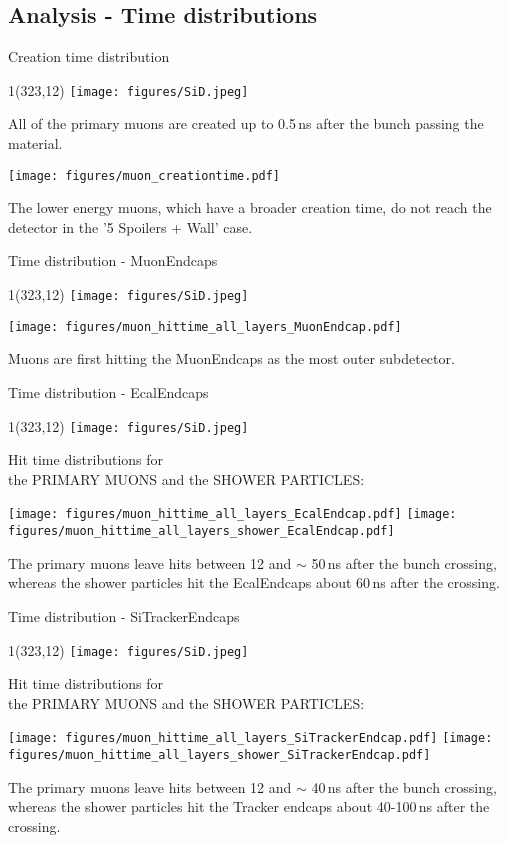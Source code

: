 \documentclass[xcolor={dvipsnames}]{beamer}
\newcommand{\sidlogo}{
  \setlength{\TPHorizModule}{1pt}
  \setlength{\TPVertModule}{1pt}
  \begin{textblock}{1}(323,12)
   \texttt{[image: figures/SiD.jpeg]}
  \end{textblock}
  }
\begin{document}
\subsection{Analysis - Time distributions}
\begin{frame}{Creation time distribution}
\sidlogo
All of the primary muons are created up to 0.5\,ns after the bunch passing the material.
 \begin{center}
\texttt{[image: figures/muon\_creationtime.pdf]}
\end{center}
The lower energy muons, which have a broader creation time, do not reach the detector in the '5 Spoilers + Wall' case.
\end{frame}
\begin{frame}{Time distribution - \small MuonEndcaps}
\sidlogo
 \begin{center}
\texttt{[image: figures/muon\_hittime\_all\_layers\_MuonEndcap.pdf]}
\end{center}
Muons are first hitting the MuonEndcaps as the most outer subdetector.
\end{frame}
\begin{frame}{Time distribution - \small EcalEndcaps}
\sidlogo
Hit time distributions for \\
\hspace*{0.6cm} the PRIMARY MUONS and the SHOWER PARTICLES:
 \begin{center}
\texttt{[image: figures/muon\_hittime\_all\_layers\_EcalEndcap.pdf]}
\texttt{[image: figures/muon\_hittime\_all\_layers\_shower\_EcalEndcap.pdf]}
\end{center}
The primary muons leave hits between 12 and $\sim$ 50\,ns after the bunch crossing, whereas the shower particles hit the EcalEndcaps about 60\,ns after the crossing.
\end{frame}
\begin{frame}{Time distribution - \small SiTrackerEndcaps}
\sidlogo
Hit time distributions for \\
\hspace*{0.6cm} the PRIMARY MUONS and the SHOWER PARTICLES:
 \begin{center}
\texttt{[image: figures/muon\_hittime\_all\_layers\_SiTrackerEndcap.pdf]}
\texttt{[image: figures/muon\_hittime\_all\_layers\_shower\_SiTrackerEndcap.pdf]}
\end{center}
The primary muons leave hits between 12 and $\sim$ 40\,ns after the bunch crossing, whereas the shower particles hit the Tracker endcaps about 40-100\,ns after the crossing.
\end{frame}
\end{document}
